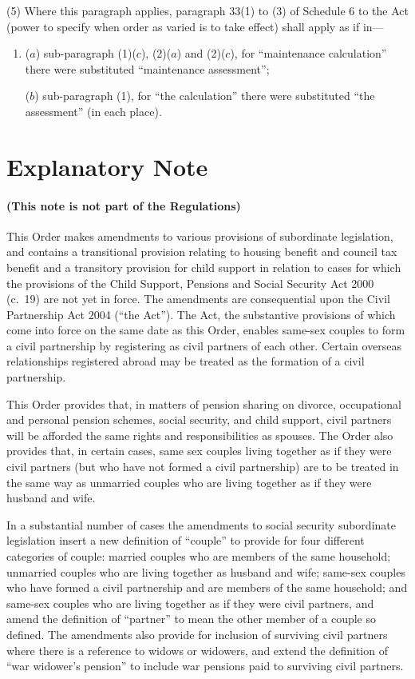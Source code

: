 \documentclass[12pt,a4paper]{article}
\begin{document}
(5) Where this paragraph applies, paragraph 33(1) to (3) of Schedule 6 to the Act (power to specify when order as varied is to take effect) shall apply as if in—
\begin{enumerate}\item[]
($a$) sub-paragraph (1)($c$), (2)($a$)  and (2)($c$), for “maintenance calculation” there were substituted “maintenance assessment”;

($b$) sub-paragraph (1), for “the calculation” there were substituted “the assessment” (in each place).
\end{enumerate}

\part{Explanatory Note}

\renewcommand\parthead{— Explanatory Note}

\subsection*{(This note is not part of the Regulations)}

This Order makes amendments to various provisions of subordinate legislation, and contains a transitional provision relating to housing benefit and council tax benefit and a transitory provision for child support in relation to cases for which the provisions of the Child Support, Pensions and Social Security Act 2000 (c.\ 19) are not yet in force. The amendments are consequential upon the Civil Partnership Act 2004 (“the Act”). The Act, the substantive provisions of which come into force on the same date as this Order, enables same-sex couples to form a civil partnership by registering as civil partners of each other. Certain overseas relationships registered abroad may be treated as the formation of a civil partnership.

This Order provides that, in matters of pension sharing on divorce, occupational and personal pension schemes, social security, and child support, civil partners will be afforded the same rights and responsibilities as spouses. The Order also provides that, in certain cases, same sex couples living together as if they were civil partners (but who have not formed a civil partnership) are to be treated in the same way as unmarried couples who are living together as if they were husband and wife.

In a substantial number of cases the amendments to social security subordinate legislation insert a new definition of “couple” to provide for four different categories of couple: married couples who are members of the same household; unmarried couples who are living together as husband and wife; same-sex couples who have formed a civil partnership and are members of the same household; and same-sex couples who are living together as if they were civil partners, and amend the definition of “partner” to mean the other member of a couple so defined. The amendments also provide for inclusion of surviving civil partners where there is a reference to widows or widowers, and extend the definition of “war widower’s pension” to include war pensions paid to surviving civil partners.
\end{document}

